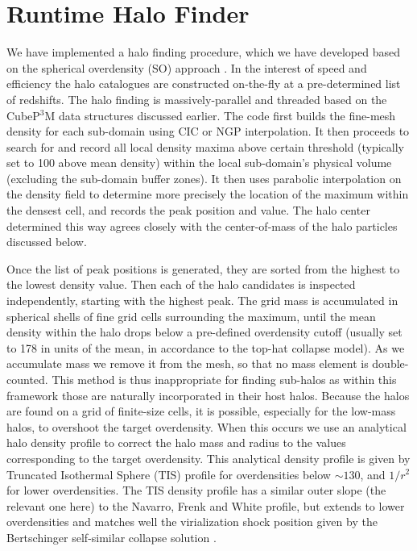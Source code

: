 \section{Runtime Halo Finder}
\label{sec:halo}


We have implemented a halo finding procedure, which we have developed 
based on the spherical overdensity (SO) approach \citep{1994MNRAS.271..676L}.
In the interest of speed and efficiency the halo catalogues are constructed 
on-the-fly at a pre-determined list of redshifts. The halo finding is 
massively-parallel and threaded based on the CubeP$^3$M data structures 
discussed earlier. The code first builds the 
fine-mesh density for each sub-domain using CIC or NGP interpolation. It then 
proceeds to search for and record all local density maxima above certain
threshold (typically set to 100 above mean density) within the local 
sub-domain's physical volume (excluding the sub-domain buffer zones). It then 
uses parabolic interpolation on the density field to determine more precisely
the location of the maximum within the densest cell, and records the peak 
position and value. The halo center determined this way agrees closely with 
the center-of-mass of the halo particles discussed below.  

Once the list of peak positions is generated, they are sorted from the highest 
to the lowest density value. Then each of the halo candidates is inspected 
independently, starting with the highest peak. The grid mass is accumulated 
in spherical shells of fine grid cells surrounding the maximum, until the 
mean density within the halo drops below a pre-defined overdensity cutoff 
(usually set to 178 in units of the mean, in accordance to the top-hat 
collapse model). As we accumulate mass we remove it from the mesh, so that no 
mass element is double-counted. This method is thus inappropriate for finding 
sub-halos as within this framework those are naturally incorporated in their 
host halos. Because the halos are found on a grid of finite-size cells, it is 
possible, especially for the low-mass halos, to overshoot the target overdensity.
When this occurs we use an analytical halo density profile to correct the 
halo mass and radius to the values corresponding to the target overdensity. 
This analytical density profile is given by Truncated Isothermal Sphere (TIS) 
profile \citep{1999MNRAS.307..203S,2001MNRAS.325..468I} for overdensities below 
$\sim130$, and $1/r^2$ for lower overdensities. The TIS density profile has a
similar outer slope (the relevant one here) to the Navarro, Frenk and White 
\citep[NFW][]{1997ApJ...490..493N} profile, but extends to lower overdensities
and matches well the virialization shock position given by the Bertschinger 
self-similar collapse solution \citep{1985ApJS...58...39B}.


